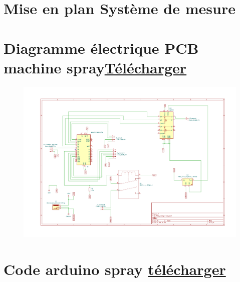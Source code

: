 \section[Mise en plan Système de mesure]{Mise en plan Système de mesure}\label{mise_en_plan_systeme_mesure}

\begin{figure}[H]
    \centering
    
\end{figure}


\section[Diagramme électrique PCB machine spray]{Diagramme électrique PCB machine spray\href{https://1drv.ms/b/s!Altwa7Vt0GlIj55oN6zv-TJly9lecA?e=SIccNb}{Télécharger}}\label{PCB:spray}
\begin{figure}[H]
    \centering
    \includegraphics[angle = 90,height = 0.8\paperheight]{assets/Annexes/Diagramme_PCB_spray.pdf}
\end{figure}

\newpage
\section[Code arduino spray]{Code arduino spray \href{https://1drv.ms/u/s!Altwa7Vt0GlIj55sbwjUy42-4cwf4g?e=tI8KgJ}{télécharger}}\label{code:arduino_spray}


